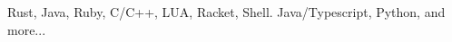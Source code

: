 \item[Languages:] Rust, Java, Ruby, C/C++, LUA, Racket, Shell. Java/Typescript,
Python, and more...
